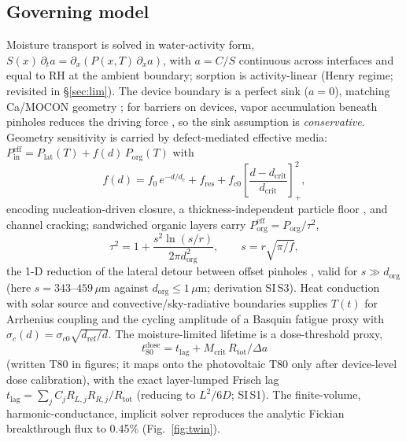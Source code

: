 \documentclass[11pt]{article}
\newcommand{\dorg}{d_{\mathrm{org}}}
\newcommand{\tdose}{t_{80}^{\mathrm{dose}}}
\begin{document}
\subsection{Governing model}\label{sec:model}
Moisture transport is solved in water-activity form, $S(x)\,\partial_t a=\partial_x\!\left(P(x,T)\,\partial_x a\right)$, with $a=C/S$ continuous across interfaces and equal to RH at the ambient boundary; sorption is activity-linear (Henry regime; revisited in \S\ref{sec:lim}). The device boundary is a perfect sink ($a{=}0$), matching Ca/MOCON geometry \cite{wu2018,rossi1993}; for barriers on devices, vapor accumulation beneath pinholes reduces the driving force \cite{rossi1993}, so the sink assumption is \emph{conservative}. Geometry sensitivity is carried by defect-mediated effective media: $P_{\mathrm{in}}^{\mathrm{eff}}=P_{\mathrm{lat}}(T)+f(d)\,P_{\mathrm{org}}(T)$ with
\begin{equation}
f(d)=f_0\,e^{-d/d_c}+f_{\mathrm{res}}+f_{c0}\!\left[\frac{d-d_{\mathrm{crit}}}{d_{\mathrm{crit}}}\right]_+^{2},
\label{eq:fd}
\end{equation}
encoding nucleation-driven closure, a thickness-independent particle floor \cite{wu2018,dasilva2000}, and channel cracking; sandwiched organic layers carry $P_{\mathrm{org}}^{\mathrm{eff}}=P_{\mathrm{org}}/\tau^2$,
\begin{equation}
\tau^{2}=1+\frac{s^{2}\ln(s/r)}{2\pi \dorg^{2}},\qquad s=r\sqrt{\pi/f},
\label{eq:tau}
\end{equation}
the 1-D reduction of the lateral detour between offset pinholes \cite{graff2004}, valid for $s\gg \dorg$ (here $s=343$--$459\,\mu$m against $\dorg\le1\,\mu$m; derivation SI\,S3). Heat conduction with solar source and convective/sky-radiative boundaries supplies $T(t)$ for Arrhenius coupling and the cycling amplitude of a Basquin fatigue proxy with $\sigma_c(d)=\sigma_{c0}\sqrt{d_{\mathrm{ref}}/d}$. The moisture-limited lifetime is a dose-threshold proxy,
\begin{equation}
\tdose=t_{\mathrm{lag}}+M_{\mathrm{crit}}\,R_{\mathrm{tot}}/\Delta a
\end{equation}
(written T80 in figures; it maps onto the photovoltaic T80 only after device-level dose calibration), with the exact layer-lumped Frisch lag \cite{frisch1957} $t_{\mathrm{lag}}=\sum_j C_j R_{L,j}R_{R,j}/R_{\mathrm{tot}}$ (reducing to $L^2/6D$; SI\,S1). The finite-volume, harmonic-conductance, implicit solver reproduces the analytic Fickian breakthrough flux to 0.45\% (Fig.~\ref{fig:twin}).
\end{document}
